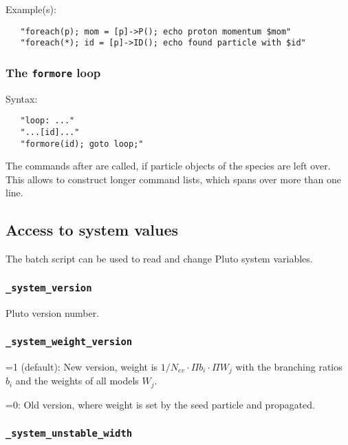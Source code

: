 {Example(s):

\begin{verbatim}
   "foreach(p); mom = [p]->P(); echo proton momentum $mom"
   "foreach(*); id = [p]->ID(); echo found particle with $id"
\end{verbatim}


\subsubsection{The \texttt{formore} loop}

Syntax:

\begin{verbatim}
   "loop: ..."
   "...[id]..."
   "formore(id); goto loop;"
\end{verbatim}

The commands after  are called, if particle objects of the
species  are left over. This allows to construct longer command
lists, which spans over more than one line.

\subsection{Access to system values}

The batch script can be used to read and change Pluto system
variables.


\subsubsection{\texttt{\_system\_version}} 

Pluto version number.

\subsubsection{\texttt{\_system\_weight\_version}}

=1 (default): New version, weight is $1/N_{ev} \cdot \Pi b_i  \cdot \Pi W_j$ with
the branching ratios $b_i$ and the weights of all models $W_j$.

=0: Old version, where weight is set by the seed particle and propagated.

\subsubsection{\texttt{\_system\_unstable\_width}}

}
